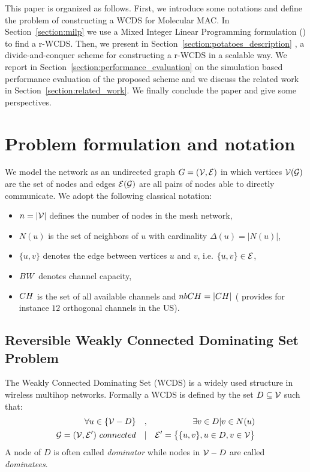 \documentclass[twoside]{article}
\begin{document}
This paper is organized as follows. First, we introduce some notations
and define the problem of constructing a WCDS for Molecular MAC. In
Section~\ref{section:milp} we use a Mixed Integer Linear
Programming formulation (\milp) to find a r-WCDS. Then, we present in
Section~\ref{section:potatoes_description} \potatoes, a
divide-and-conquer scheme for constructing a r-WCDS in a scalable
way. We report in Section~\ref{section:performance_evaluation} on the
simulation based performance evaluation of the proposed scheme and
we discuss the related work in Section~\ref{section:related_work}. We
finally conclude the paper and give some perspectives.





\section{Problem formulation and notation}
\label{section:problem_formulation}

We model the network as an undirected graph $G=(\mathcal{V},\mathcal{E})$ in which vertices
$\mathcal{V}(\mathcal{G})$ are the set of nodes and edges $\mathcal{E}(\mathcal{G})$ are all pairs of nodes
able to directly communicate. We adopt the following classical
notation:
\begin{itemize}
	\item $n=|\mathcal{V}|$ defines the number of nodes in the mesh network,
	\item $N(u)$ is the set of neighbors of $u$ with
          cardinality $\Delta(u) = |N(u)|$,
	\item $\{u,v\}$ denotes the edge between vertices $u$ and $v$, i.e. $\{u,v\} \in \mathcal{E}$,
	\item $BW$ denotes channel capacity,
	\item $CH$ is the set of all available channels and $nbCH =
          |CH|$ ( provides for instance $12$ orthogonal
          channels in the US).
\end{itemize}


\subsection{Reversible Weakly Connected Dominating Set Problem}

The Weakly Connected Dominating Set (WCDS) \cite{dunbar97} is a widely
used structure in wireless multihop networks.
Formally a WCDS is defined by the set $D\subseteq \mathcal{V}$ such that:
\setlength{\arraycolsep}{0.0em}
\begin{eqnarray}
\forall u \in \{\mathcal{V}-D\} 		& \quad 	,	& \quad \exists v \in D |  v \in N(u) \\
\mathcal{G}=(\mathcal{V},\mathcal{E}')\ connected 	& \quad 	|	& \mathcal{E}'=\big\{ \{u,v\},  u \in D, v \in \mathcal{V}\big\}
\label{eq:wcds}
\end{eqnarray}
A node of $D$ is often called \emph{dominator} while nodes in  $\mathcal{V}-D$
are called \emph{dominatees}. 
\end{document}
